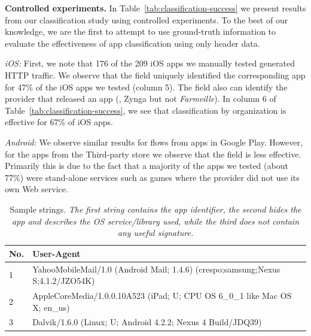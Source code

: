 

\noindent\textbf{Controlled experiments.}
In Table~\ref{tab:classification-success} we present results from our classification study using controlled experiments. To 
the best of our knowledge, we are the first to attempt to use ground-truth information to evaluate the 
effectiveness of app classification using only header data.
 

\emph{iOS:}
First, we note that 176 of the 209 iOS apps we manually tested generated HTTP traffic.
We observe that the \httphost field uniquely identified the corresponding app for 47\% of the iOS apps we tested (column 5).
The \httphost field also can identify the provider that released an app (\eg, Zynga but not \emph{Farmville}).
In column 6 of Table~\ref{tab:classification-success}, we see that classification by organization is effective for 67\% of iOS apps. 


\emph{Android:} We observe similar results for flows from apps in Google Play.
However, for the apps from the Third-party store we observe that the \httphost field is less effective. 
Primarily this is due to the fact that a majority of the apps we tested (about 77\%) were stand-alone services such as games where the provider did not use its own Web service. %

\begin{table}
\begin{small}
\begin{tabular}{|l|p{}|}
\hline
{\bf No. } & {\bf User-Agent}\tabularnewline
\hline
1 & YahooMobileMail/1.0 (Android Mail; 1.4.6) (crespo;samsung;Nexus S;4.1.2/JZO54K)\tabularnewline
\hline
2 & AppleCoreMedia/1.0.0.10A523 (iPad; U; CPU OS 6\_0\_1 like Mac OS X; en\_us) \tabularnewline
\hline
3 & Dalvik/1.6.0 (Linux; U; Android 4.2.2; Nexus 4 Build/JDQ39) \tabularnewline
\hline
\end{tabular}
\end{small}
\caption{Sample \useragent strings. \emph{The first string contains the app identifier, the second hides the app and describes the OS service/library used, while the third does not contain any useful signature.}}
\vspace{\postfigspace}
\label{tab:user-agent}
\end{table}

